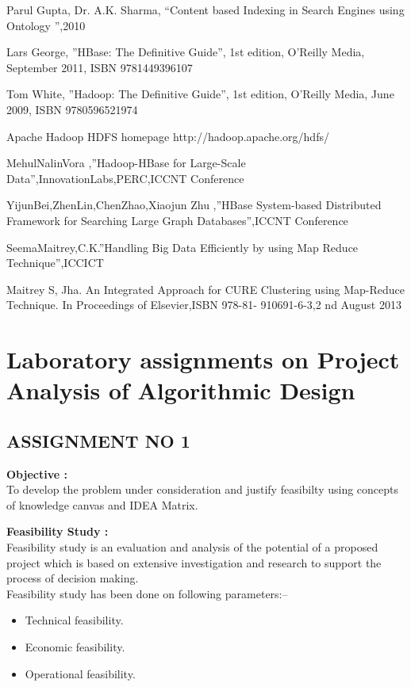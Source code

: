 \documentclass[oneside,a4paper,12pt]{report}
\begin{document}
{%
\begin{appendices}

\begin{thebibliography}{7}

 Parul Gupta, Dr. A.K. Sharma, “Content based Indexing in Search Engines using Ontology ”,2010

 Lars George, ”HBase: The Definitive Guide”, 1st edition, O’Reilly Media, September 2011,   ISBN 9781449396107

 Tom White, ”Hadoop: The Definitive Guide”, 1st edition, O’Reilly Media, June 2009, ISBN 9780596521974

 Apache Hadoop HDFS homepage http://hadoop.apache.org/hdfs/

 MehulNalinVora ,”Hadoop-HBase for Large-Scale Data”,InnovationLabs,PERC,ICCNT Conference

 YijunBei,ZhenLin,ChenZhao,Xiaojun Zhu ,”HBase System-based Distributed Framework for Searching Large Graph Databases”,ICCNT Conference

 SeemaMaitrey,C.K.”Handling Big Data Efficiently by using Map Reduce Technique”,ICCICT

 Maitrey S, Jha. An Integrated Approach for CURE Clustering using Map-Reduce Technique. In Proceedings of Elsevier,ISBN 978-81- 910691-6-3,2 nd August 2013


\end{thebibliography}


\chapter{Laboratory assignments on Project Analysis of Algorithmic Design}


\section{ASSIGNMENT NO 1}

\textbf{Objective :} \\

To develop the problem under consideration and justify feasibilty using concepts of knowledge canvas and IDEA Matrix.

\textbf{Feasibility Study : } \\
Feasibility study is an evaluation and analysis of the potential of a proposed project which is based on extensive investigation and research to support the process of decision making.
\\
Feasibility study has been done on following parameters:--
\begin{itemize}
\item Technical feasibility.
\item Economic feasibility.
\item Operational feasibility.
\end{itemize}


\end{appendices}}
\end{document}
